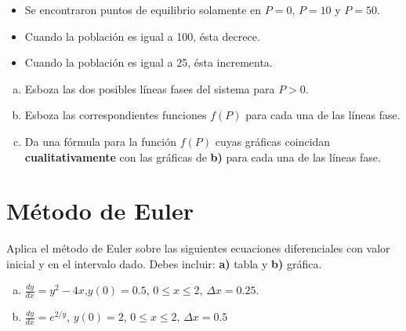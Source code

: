 \documentclass[12pt]{exam}
\begin{document}
\begin{questions}
     \begin{itemize}
         \item Se encontraron puntos de equilibrio solamente en $P=0$, $P=10$ y $P=50$.
         \item Cuando la población es igual a 100, ésta decrece.
         \item Cuando la población es igual a 25, ésta incrementa.
     \end{itemize}
     
     \begin{enumerate}[a)]
         \item Esboza las dos posibles líneas fases del sistema para $P>0$.
         \item Esboza las correspondientes funciones $f(P)$ para cada una de las líneas fase.
         \item Da una fórmula para la función $f(P)$ cuyas gráficas coincidan \textbf{cualitativamente} con las gráficas de \textbf{b)} para cada una de las líneas fase.
     \end{enumerate}


     

    \section{Método de Euler}

     \question%
     Aplica el método de Euler sobre las siguientes ecuaciones diferenciales con valor inicial y en el intervalo dado. Debes incluir: \textbf{a)} tabla y \textbf{b)} gráfica.
     
     \begin{enumerate}[a)]
         \item $\frac{dy}{dx}=y^2-4x$,\quad $y(0)=0.5$, \quad$0\leq x\leq2$, \quad$ \Delta x=0.25$.
         \item $\frac{dy}{dx}=e^{2/y}$, \quad$y(0)=2$, \quad$0\leq x\leq2$, \quad$\Delta x=0.5$
     \end{enumerate}


\end{questions}
\end{document}
